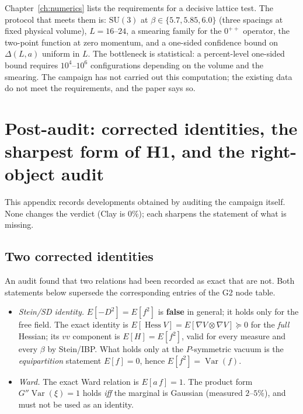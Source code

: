 Chapter~\ref{ch:numerics} lists the requirements for a decisive lattice test. The protocol that
meets them is: $\mathrm{SU}(3)$ at $\beta\in\{5.7,5.85,6.0\}$ (three spacings at fixed physical
volume), $L=16$--$24$, a smearing family for the $0^{++}$ operator, the two-point function at
zero momentum, and a one-sided confidence bound on $\Delta(L,a)$ uniform in $L$. The bottleneck
is statistical: a percent-level one-sided bound requires $10^4$--$10^6$ configurations depending
on the volume and the smearing. The campaign has not carried out this computation; the existing
data do not meet the requirements, and the paper says so.

\section{Post-audit: corrected identities, the sharpest form of H1, and the right-object audit}
\label{app:postaudit}

This appendix records developments obtained by auditing the campaign itself. None changes the
verdict (Clay is $0\%$); each sharpens the statement of what is missing.

\subsection{Two corrected identities}

An audit found that two relations had been recorded as exact that are not. Both statements below
supersede the corresponding entries of the G2 node table.
\begin{itemize}
\item \LT{} \emph{Stein/SD identity.} $E[-D^{2}]=E[f^{2}]$ is \textbf{false} in general; it holds
  only for the free field. The exact identity is
  $E[\operatorname{Hess}V]=E[\nabla V\otimes\nabla V]\succeq0$ for the \emph{full} Hessian; its
  $vv$ component is $E[H]=E[f^{2}]$, valid for every measure and every $\beta$ by Stein/IBP.
  What holds only at the $P$-symmetric vacuum is the \emph{equipartition} statement $E[f]=0$,
  hence $E[f^{2}]=\operatorname{Var}(f)$.
\item \LT{} \emph{Ward.} The exact Ward relation is $E[a\,f]=1$. The product form
  $G''\operatorname{Var}(\xi)=1$ holds \emph{iff} the marginal is Gaussian (measured $2$--$5\%$),
  and must not be used as an identity.
\end{itemize}

